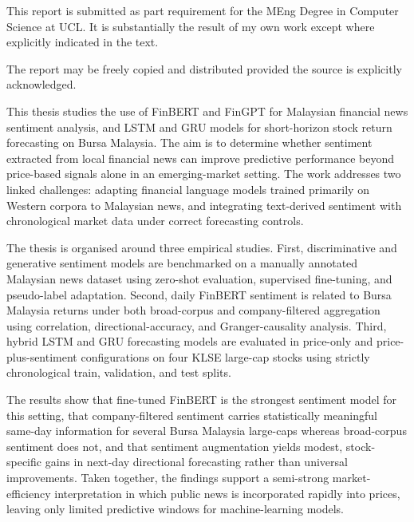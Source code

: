 \documentclass[12pt]{ucetd}
\date{2026}
\title{\thesistitle}
\author{\thesisauthor}
\begin{document}
\maketitle

\makecopyright

\newpage
\thispagestyle{empty}
\vspace*{\fill}
\noindent
This report is submitted as part requirement for the MEng Degree in Computer
Science at UCL. It is substantially the result of my own work except where
explicitly indicated in the text.

\vspace{1em}
\noindent
The report may be freely copied and distributed provided the source is explicitly
acknowledged.
\vspace*{\fill}
\newpage

\abstract
This thesis studies the use of FinBERT and FinGPT for Malaysian financial news sentiment analysis, and LSTM and GRU models for short-horizon stock return forecasting on Bursa Malaysia. The aim is to determine whether sentiment extracted from local financial news can improve predictive performance beyond price-based signals alone in an emerging-market setting. The work addresses two linked challenges: adapting financial language models trained primarily on Western corpora to Malaysian news, and integrating text-derived sentiment with chronological market data under correct forecasting controls.

The thesis is organised around three empirical studies. First, discriminative and generative sentiment models are benchmarked on a manually annotated Malaysian news dataset using zero-shot evaluation, supervised fine-tuning, and pseudo-label adaptation. Second, daily FinBERT sentiment is related to Bursa Malaysia returns under both broad-corpus and company-filtered aggregation using correlation, directional-accuracy, and Granger-causality analysis. Third, hybrid LSTM and GRU forecasting models are evaluated in price-only and price-plus-sentiment configurations on four KLSE large-cap stocks using strictly chronological train, validation, and test splits.

The results show that fine-tuned FinBERT is the strongest sentiment model for this setting, that company-filtered sentiment carries statistically meaningful same-day information for several Bursa Malaysia large-caps whereas broad-corpus sentiment does not, and that sentiment augmentation yields modest, stock-specific gains in next-day directional forecasting rather than universal improvements. Taken together, the findings support a semi-strong market-efficiency interpretation in which public news is incorporated rapidly into prices, leaving only limited predictive windows for machine-learning models.
\end{document}
